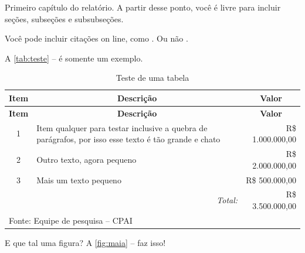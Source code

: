 
Primeiro capítulo do relatório. A partir desse ponto, você é livre para incluir seções, subseções e subsubseções.

Você pode incluir citações on line, como . Ou não \cite{lima-marques_outline_2011}.

A \autoref{tab:teste} --  é somente um exemplo.

\begin{longtable}{c | p{10cm} | r }
    \caption[Teste]{Teste de uma tabela}\label{tab:teste} \\

    \toprule
    \textbf{Item} & \multicolumn{1}{c|}{\textbf{Descrição}} & \multicolumn{1}{c}{\textbf{Valor}} \\ \midrule \endfirsthead

    \toprule
    \textbf{Item} & \multicolumn{1}{c|}{\textbf{Descrição}} & \multicolumn{1}{c}{\textbf{Valor}} \\ \midrule \endhead

    1 & Item qualquer para testar inclusive a quebra de parágrafos, por isso esse texto é tão grande e chato &
    R\$ 1.000.000,00 \\ \hline
    
    2 & Outro texto, agora pequeno &
    R\$ 2.000.000,00 \\ \hline
    
    3 & Mais um texto pequeno &
    R\$ 500.000,00 \\ \hline
    
    \multicolumn{2}{r|}{\emph{Total:}} & R\$ 3.500.000,00 \\ \bottomrule
    
    \multicolumn{3}{l}{\footnotesize Fonte: Equipe de pesquisa -- CPAI} \\

\end{longtable}

E que tal uma figura? A \autoref{fig:maia} --  faz isso! 

